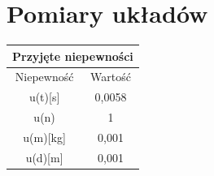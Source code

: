 \documentclass[12pt]{article}
\begin{document}
\section{Pomiary układów}

\begin{table}[!htbp]
    \centering
    \begin{adjustbox}{width=0.4\textwidth}
    \begin{tabular}{|c|c|}
    \hline
    \multicolumn{2}{|c|}{Przyjęte niepewności} \\
    \hline
    Niepewność & Wartość \\ \hline
    u(t)[s] & 0,0058 \\ \hline
    u(n) & 1 \\ \hline
    u(m)[kg] & 0,001 \\ \hline
    u(d)[m] & 0,001 \\ \hline
    \end{tabular}
\end{adjustbox}
\end{table}
\end{document}
